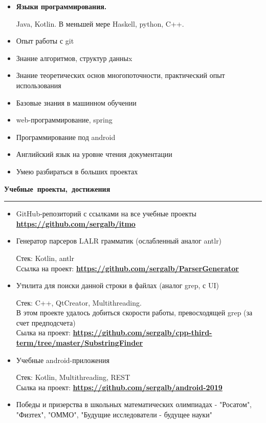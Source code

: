 \documentclass[12pt, a4paper]{report}
\begin{document}
    \begin{itemize}

        \item \textbf{Языки программирования.}

        Java, Kotlin. В меньшей мере Haskell, python, C++.

        \item Опыт работы с git
        \item Знание алгоритмов, структур данныx
        \item Знание теоретических основ многопоточности, практический опыт использования
        \item Базовые знания в машинном обучении
        \item web-программирование, spring
        \item Программирование под android
        \item Английский язык на уровне чтения документации
        \item Умею разбираться в больших проектах\\
    \end{itemize}

    \par\hbox{\large\textbf{Учебные проекты, достижения}}\kern5pt\hrule\kern5pt
    \begin{itemize}

        \item GitHub-репозиторий с ссылками на все учебные проекты \textbf{\url{https://github.com/sergalb/itmo}}

        \item Генератор парсеров LALR грамматик (ослабленный аналог antlr)

        Стек: Kotlin, antlr\\
        Ссылка на проект:
        \textbf{
        \url{https://github.com/sergalb/ParserGenerator}
        }

        \item Утилита для поиски данной строки в файлах (аналог grep, с UI)

        Стек: C++, QtCreator, Multithreading.\\
        В этом проекте удалось добиться скорости работы, превосходящей grep (за счет предподсчета)\\
        Сылка на проект:
        \textbf{
        \url{https://github.com/sergalb/cpp-third-term/tree/master/SubstringFinder}
        }

        \item Учебные android-приложения

        Стек: Kotlin, Multithreading, REST\\
        Сылка на проект:
        \textbf{
        \url{https://github.com/sergalb/android-2019}
        }

        \item Победы и призерства в школьных математических олимпиадах - "Росатом", "Физтех", "ОММО", "Будущие исследователи - будущее науки"

    \end{itemize}
\end{document}
